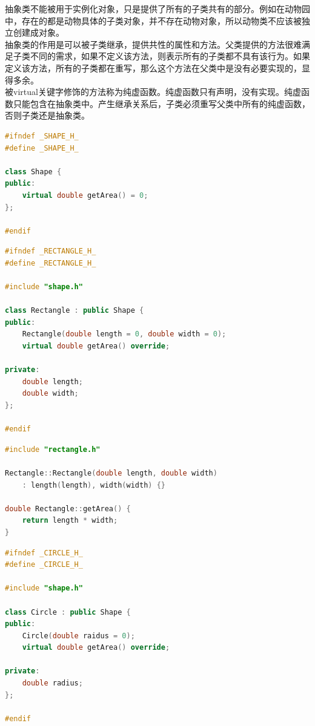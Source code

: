 抽象类不能被用于实例化对象，只是提供了所有的子类共有的部分。例如在动物园中，存在的都是动物具体的子类对象，并不存在动物对象，所以动物类不应该被独立创建成对象。\\

抽象类的作用是可以被子类继承，提供共性的属性和方法。父类提供的方法很难满足子类不同的需求，如果不定义该方法，则表示所有的子类都不具有该行为。如果定义该方法，所有的子类都在重写，那么这个方法在父类中是没有必要实现的，显得多余。\\

被virtual关键字修饰的方法称为纯虚函数。纯虚函数只有声明，没有实现。纯虚函数只能包含在抽象类中。产生继承关系后，子类必须重写父类中所有的纯虚函数，否则子类还是抽象类。\\


\begin{lstlisting}[language=C++, title=shape.h]
#ifndef _SHAPE_H_
#define _SHAPE_H_

class Shape {
public:
	virtual double getArea() = 0;
};

#endif
\end{lstlisting}

\begin{lstlisting}[language=C++, title=rectangle.h]
#ifndef _RECTANGLE_H_
#define _RECTANGLE_H_

#include "shape.h"

class Rectangle : public Shape {
public:
	Rectangle(double length = 0, double width = 0);
	virtual double getArea() override;

private:
	double length;
	double width;
};

#endif
\end{lstlisting}

\begin{lstlisting}[language=C++, title=rectangle.cpp]
#include "rectangle.h"

Rectangle::Rectangle(double length, double width)
	: length(length), width(width) {}

double Rectangle::getArea() {
	return length * width;
}
\end{lstlisting}

\begin{lstlisting}[language=C++, title=circle.h]
#ifndef _CIRCLE_H_
#define _CIRCLE_H_

#include "shape.h"

class Circle : public Shape {
public:
	Circle(double raidus = 0);
	virtual double getArea() override;

private:
	double radius;
};

#endif
\end{lstlisting}

